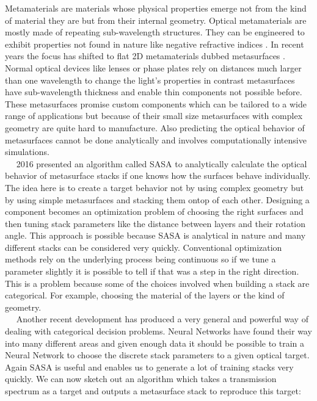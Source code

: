 Metamaterials are materials whose physical properties emerge not from the kind of material they are but from their internal geometry. Optical metamaterials are mostly made of repeating sub-wavelength structures. They can be engineered to exhibit properties not found in nature like negative refractive indices \cite{Shelby2001}. In recent years the focus has shifted to flat 2D metamaterials dubbed metasurfaces \cite{Yu2014}. Normal optical devices like lenses or phase plates rely on distances much larger than one wavelength to change the light's properties in contrast metasurfaces have sub-wavelength thickness and enable thin components not possible before.  These metasurfaces promise custom components which can be tailored to a wide range of applications
but because of their small size metasurfaces with complex geometry are quite hard to manufacture. Also predicting the optical behavior of metasurfaces cannot be done analytically and involves computationally intensive simulations.
\\

$\quad$
2016 \cite{Menzel2016} presented an algorithm called SASA to analytically calculate the optical behavior of metasurface stacks if one knows how the surfaces behave individually. The idea here is to create a target behavior not by using complex geometry but by using simple metasurfaces and stacking them ontop of each other. Designing a component becomes an optimization problem of choosing the right surfaces and then tuning stack parameters like the distance between layers and their rotation angle. This approach is possible because SASA is analytical in nature and many different stacks can be considered very quickly. Conventional optimization methods rely on the underlying process being continuous so if we tune a parameter slightly it is possible to tell if that was a step in the right direction. This is a problem because some of the choices involved when building a stack are categorical. For example, choosing the material of the layers or the kind of geometry.
\\

$\quad$
Another recent development has produced a very general and powerful way of dealing with categorical decision problems. Neural Networks have found their way into many different areas and given enough data it should be possible to train a Neural Network to choose the discrete stack parameters to a given optical target. Again SASA is useful and enables us to generate a lot of training stacks very quickly. We can now sketch out an algorithm which takes a transmission spectrum as a target and outputs a metasurface stack to reproduce this target:
\\
\\

